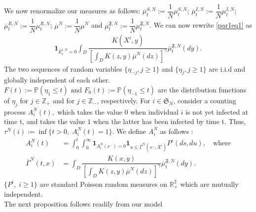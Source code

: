\documentclass[notitlepage,reqno,11pt]{amsart}
\numberwithin{equation}{section}
\begin{document}
We now renormalize our measures as follows: $\overline{\mu}_t^{S,N}:=\dfrac{1}{N}\mu_t^{S,N}$; $\overline{\mu}_t^{I,N}:=\dfrac{1}{N}\mu_t^{I,N}$; $\overline{\mu}_t^{R,N}:=\dfrac{1}{N}\mu_t^{R,N}$; $\overline{\mu}^{N}:=\dfrac{1}{N}\mu^{N}$ and $\overline{\mu}_t^{\mathfrak{F},N}:=\dfrac{1}{N}\mu_t^{\mathfrak{F},N}$.
We can now rewrite \eqref{par1eq1} as
\begin{align*}
\mathbf{1}_{E_{t}^{i,N}=0}\int_{D} \dfrac{K(X^{i},y)}{\left[\displaystyle \int_{D}K(z,y)\overline{\mu}^{N}(dz) \right]^{\gamma}}\overline{\mu}_t^{\mathfrak{F},N}(dy).
\end{align*}
The two sequences of random variables $\{\eta_{-j} , j\geq 1\}$ and $\{\eta_{j} , j\geq 1\}$  are i.i.d and globally independent of each other. $F(t) := \mathbb{P}(\eta_1\leq t) \text{ and }F_0(t) := \mathbb{P}(\eta_{-1}\leq t)$ are the distribution functions of $\eta_j$ for $j\in \mathbb{Z}_+$ and for $j\in \mathbb{Z}_-$, respectively. For $ i \in \mathfrak{S}_N$, consider a counting process $A_i^N(t),$ which takes the value $0$ when individual $i$ is not yet infected at time t, and takes the value $1$ when the latter has been infected by time t. Thus, $\tau^N(i) := \inf\{t > 0,\; A_i^N(t) = 1\}$. We define $A_i^N$ as follows :
\begin{align*}
A_{i}^N(t)&=	 \int_{0}^{t}\int_{0}^{\infty}\mathbf{1}_{A^N_{i}(s^{-}) = 0}\mathbf{1}_{u\leq \overline{\Gamma}^{N}(s^-,X^i)}P^{i}(ds,du),\quad \text{where}\\
\overline{\Gamma}^{N}(t,x)&=\int_{D} \dfrac{K(x,y)}{\left[\displaystyle \int_{D}K(z,y)\overline{\mu}^{N}(dz) \right]^{\gamma}}\overline{\mu}_{t}^{\mathfrak{F},N}(dy).
\end{align*}
$\{P^{i},\;i \geq 1\}$ are standard Poisson random measures on $\mathbb{R}_{+}^2$ which are mutually independent.\\
The next proposition follows readily from our model
\end{document}

